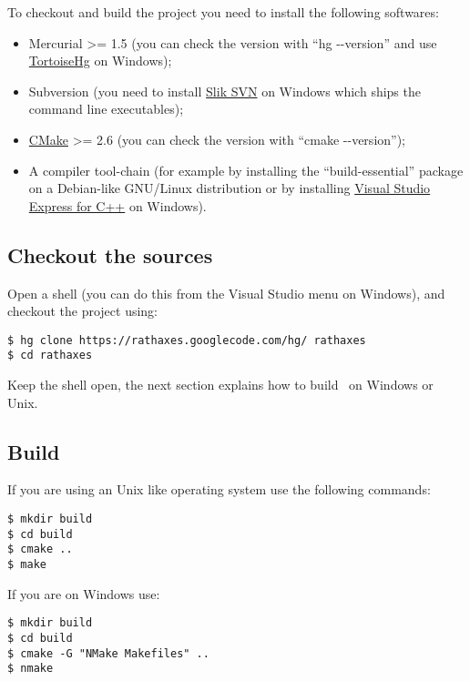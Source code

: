 \documentclass[american]{rtxarticle}
\begin{document}
To checkout and build the project you need to install the following softwares:
\begin{itemize}
\item Mercurial >= 1.5 (you can check the version with ``hg {-}{-}version'' and
      use \href{http://tortoisehg.bitbucket.org/download/index.html}{TortoiseHg}
      on Windows);
\item Subversion (you need to install \href{http://www.sliksvn.com/en/download}{Slik
      SVN} on Windows which ships the command line executables);
\item \href{http://www.cmake.org/cmake/resources/software.html}{CMake} >= 2.6
      (you can check the version with ``cmake {-}{-}version'');
\item A compiler tool-chain (for example by installing the ``build-essential'' package on a
      Debian-like GNU/Linux distribution or by installing
      \href{http://www.microsoft.com/express/Downloads/#2010-Visual-CPP}{Visual Studio Express for C++}
      on Windows).
\end{itemize}

\subsection{Checkout the sources}

Open a shell (you can do this from the Visual Studio menu on Windows), and
checkout the project using:

\begin{lstlisting}
$ hg clone https://rathaxes.googlecode.com/hg/ rathaxes
$ cd rathaxes
\end{lstlisting}

Keep the shell open, the next section explains how to build \rtx\ on Windows or
Unix.

\subsection{Build \rtx}

If you are using an Unix like operating system use the following commands:

\begin{lstlisting}
$ mkdir build
$ cd build
$ cmake ..
$ make
\end{lstlisting}

If you are on Windows use:

\begin{lstlisting}
$ mkdir build
$ cd build
$ cmake -G "NMake Makefiles" ..
$ nmake
\end{lstlisting}

\rtxmaketitleblock
\end{document}
